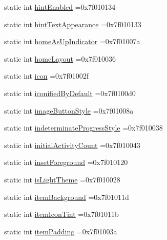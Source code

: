 \begin{DoxyCompactItemize}
static int \hyperlink{classandroid_1_1support_1_1v7_1_1recyclerview_1_1R_1_1attr_ac7e41c578d73b8c44fd228ccec8542b4}{hint\+Enabled} =0x7f010134
\item 
static int \hyperlink{classandroid_1_1support_1_1v7_1_1recyclerview_1_1R_1_1attr_a14e9beab1cfe4aff21170ec95e9176ee}{hint\+Text\+Appearance} =0x7f010133
\item 
static int \hyperlink{classandroid_1_1support_1_1v7_1_1recyclerview_1_1R_1_1attr_a68aeeb1562012b2325bdac6890d6ff08}{home\+As\+Up\+Indicator} =0x7f01007a
\item 
static int \hyperlink{classandroid_1_1support_1_1v7_1_1recyclerview_1_1R_1_1attr_a321fa14b2fed06586e03b1d01d9c255a}{home\+Layout} =0x7f010036
\item 
static int \hyperlink{classandroid_1_1support_1_1v7_1_1recyclerview_1_1R_1_1attr_a8027aa2a8786b29d88d51290c6ec678b}{icon} =0x7f01002f
\item 
static int \hyperlink{classandroid_1_1support_1_1v7_1_1recyclerview_1_1R_1_1attr_a147e0a112ef517cf607cccb4d1661e38}{iconified\+By\+Default} =0x7f0100d0
\item 
static int \hyperlink{classandroid_1_1support_1_1v7_1_1recyclerview_1_1R_1_1attr_ad528c723aad9f957fb845f3e05e9f4a4}{image\+Button\+Style} =0x7f01008a
\item 
static int \hyperlink{classandroid_1_1support_1_1v7_1_1recyclerview_1_1R_1_1attr_a2624792ec22f9d8c2857189e74ce06ab}{indeterminate\+Progress\+Style} =0x7f010038
\item 
static int \hyperlink{classandroid_1_1support_1_1v7_1_1recyclerview_1_1R_1_1attr_a173231c7914b20a353937cf417309caa}{initial\+Activity\+Count} =0x7f010043
\item 
static int \hyperlink{classandroid_1_1support_1_1v7_1_1recyclerview_1_1R_1_1attr_a45c9d37327950d0fc24ae25e3c3dabf7}{inset\+Foreground} =0x7f010120
\item 
static int \hyperlink{classandroid_1_1support_1_1v7_1_1recyclerview_1_1R_1_1attr_aca9a12a32f37685e9208da7973ab6d16}{is\+Light\+Theme} =0x7f010028
\item 
static int \hyperlink{classandroid_1_1support_1_1v7_1_1recyclerview_1_1R_1_1attr_aa440cb64557c5ddd5389d0e485f7b0f2}{item\+Background} =0x7f01011d
\item 
static int \hyperlink{classandroid_1_1support_1_1v7_1_1recyclerview_1_1R_1_1attr_acd2c70fe15fe46dd07b3a2387b55f306}{item\+Icon\+Tint} =0x7f01011b
\item 
static int \hyperlink{classandroid_1_1support_1_1v7_1_1recyclerview_1_1R_1_1attr_a56df4a1bb8fa893c7a683535e4583dbf}{item\+Padding} =0x7f01003a

\end{DoxyCompactItemize}
